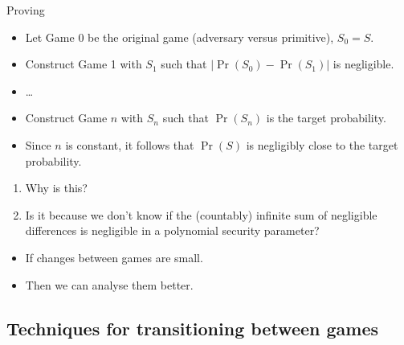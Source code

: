 \begin{frame}
  \begin{block}{Proving}
    \begin{itemize}
      \item Let Game 0 be the original game (adversary versus primitive),
        \(S_0 = S\).

        \pause{}

      \item Construct Game 1 with \(S_1\) such that \(|\Pr(S_0) - \Pr(S_1)|\) 
        is negligible.

        \pause{}

      \item \dots

      \item Construct Game \(n\) with \(S_n\) such that \(\Pr(S_n)\) is the 
        target probability.

        \pause{}

      \item \color{red} Since \(n\) is constant, it follows that \(\Pr(S)\) is 
        negligibly close to the target probability.
    \end{itemize}
  \end{block}
\end{frame}

\begin{frame}
  \begin{question}
    \begin{enumerate}
      \item Why is this?
      \item Is it because we don't know if the (countably) infinite sum of 
        negligible differences is negligible in a polynomial security 
        parameter?
    \end{enumerate}
  \end{question}
\end{frame}

\begin{frame}
  \begin{itemize}
    \item If changes between games are small.
    \item Then we can analyse them better.
  \end{itemize}
\end{frame}

\subsection{Techniques for transitioning between games}

